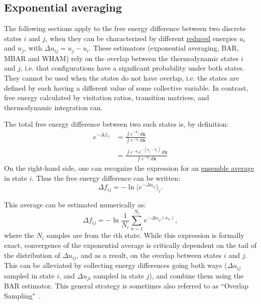 \documentclass[9pt,review]{livecoms}
\newcommand{\vx}{\mathbf{x}}
\begin{document}
\subsection{Exponential averaging}
\label{sec:fe_estimators:EXP}

The following sections apply to the free energy difference between two discrete states $i$ and $j$, when they can be characterized by different \hyperlink{ref:reduced} {reduced} energies $u_i$ and $u_j$, with $\Delta u_{ij} = u_j - u_i$.
These estimators (exponential averaging, BAR, MBAR and WHAM) rely on the overlap between the thermodynamic states $i$ and $j$, i.e. that configurations have a significant probability under both states. They cannot be used when the states do not have overlap, i.e. the states are defined by each having a different value of some collective variable.  In contrast, free energy calculated by visitation ratios, transition matrices, and thermodynamic integration can.

The total free energy difference between two such states is, by definition:
\begin{align}
    e^{-\Delta f_{ij}} &=  \frac{\int e^{-u_j} \, d\vx}{\int e^{-u_i} \, d\vx}\\
    &= \frac{\int e^{-u_i}  e^{-(u_j-u_i)} \, d\vx}{\int e^{-u_i} \, d\vx}
\end{align}
On the right-hand side, one can recognize the expression for an \hyperlink{ref:ensemble_average} {ensemble average} in state $i$.
Thus the free energy difference can be written:
\begin{equation}
    \Delta f_{ij} = -\ln \langle e^{-\Delta u_{ij}}\rangle_i.
\end{equation}

This average can be estimated numerically as:
\begin{equation}
\Delta f_{ij} = -\ln \frac{1}{N_i}\sum_{n=1}^{N_i} e^{-\Delta u_{ij}(x_n)},
\label{eq:expav}
\end{equation}
where the $N_i$ samples are from the $i$th state.
While this expression is formally exact, convergence of the exponential average is critically dependent on the tail of the distribution of $\Delta u_{ij}$, and as a result, on the overlap between states $i$ and $j$.
This can be alleviated by collecting energy differences going both ways ($\Delta u_{ij}$ sampled in state $i$, and $\Delta u_{ji}$ sampled in state $j$), and combine them using the BAR estimator.
This general strategy is sometimes also referred to as ``Overlap Sampling"~\cite{Lu2003}.
\end{document}
